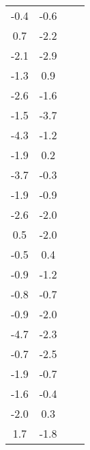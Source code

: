 \begin{longtable}{cccc}
    -0.4                                   & -0.6                            \\
    0.7                                    & -2.2                            \\
    -2.1                                   & -2.9                            \\
    -1.3                                   & 0.9                             \\
    -2.6                                   & -1.6                            \\
    -1.5                                   & -3.7                            \\
    -4.3                                   & -1.2                            \\
    -1.9                                   & 0.2                             \\
    -3.7                                   & -0.3                            \\
    -1.9                                   & -0.9                            \\
    -2.6                                   & -2.0                            \\
    0.5                                    & -2.0                            \\
    -0.5                                   & 0.4                             \\
    -0.9                                   & -1.2                            \\
    -0.8                                   & -0.7                            \\
    -0.9                                   & -2.0                            \\
    -4.7                                   & -2.3                            \\
    -0.7                                   & -2.5                            \\
    -1.9                                   & -0.7                            \\
    -1.6                                   & -0.4                            \\
    -2.0                                   & 0.3                             \\
    1.7                                    & -1.8                            \\

\end{longtable}
